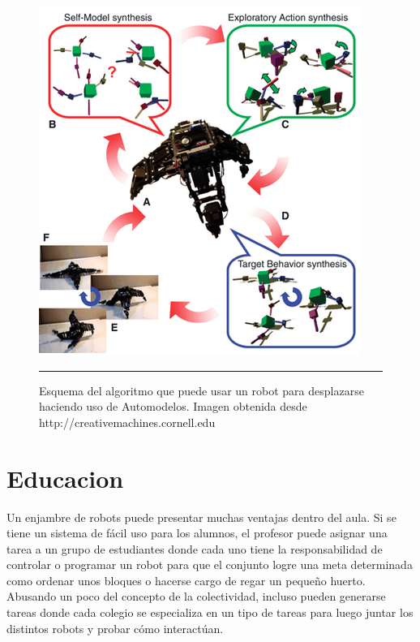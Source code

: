\begin{figure}[htbp]
	\centering
		\includegraphics[width=\textwidth]{./Figures/algoritmo_automodelo.png}
		\rule{35em}{0.5pt}
	\caption[AutomodeladoLIPSON]{Esquema del algoritmo que puede usar un robot para desplazarse haciendo uso de Automodelos. Imagen obtenida desde http://creativemachines.cornell.edu}
	\label{fig:AutomodeladoLIPSON}
\end{figure}


\section{Educacion}

Un enjambre de robots puede presentar muchas ventajas dentro del aula. Si se tiene un sistema de fácil uso para los alumnos, el profesor puede asignar una tarea a un grupo de estudiantes donde cada uno tiene la responsabilidad de controlar o programar un robot para que el conjunto logre una meta determinada como ordenar unos bloques o hacerse cargo de regar un pequeño huerto. Abusando un poco del concepto de la colectividad, incluso pueden generarse tareas donde cada colegio se especializa en un tipo de tareas para luego juntar los distintos robots y probar cómo interactúan.

